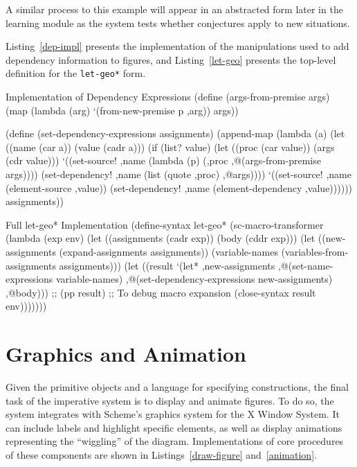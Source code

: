 A similar process to this example will appear in an abstracted form
later in the learning module as the system tests whether conjectures
apply to new situations.

\newpage
Listing~\ref{dep-impl} presents the implementation of the
manipulations used to add dependency information to figures, and
Listing~\ref{let-geo} presents the top-level definition for the
\texttt{let-geo*} form.

\begin{code-listing}
[label=dep-impl]
{Implementation of Dependency Expressions}
(define (args-from-premise args)
  (map (lambda (arg)
         `(from-new-premise p ,arg))
       args))

(define (set-dependency-expressions assignments)
  (append-map
   (lambda (a)
     (let ((name (car a))
           (value (cadr a)))
       (if (list? value)
           (let ((proc (car value))
                 (args (cdr value)))
             `((set-source!
                ,name (lambda (p) (,proc ,@(args-from-premise args))))
               (set-dependency!
                ,name (list (quote ,proc) ,@args))))
           `((set-source! ,name (element-source ,value))
             (set-dependency! ,name (element-dependency ,value))))))
   assignments))
\end{code-listing}

\begin{code-listing}
[label=let-geo]
{Full let-geo* Implementation}
(define-syntax let-geo*
  (sc-macro-transformer
   (lambda (exp env)
     (let ((assignments (cadr exp))
           (body (cddr exp)))
       (let ((new-assignments (expand-assignments assignments))
             (variable-names (variables-from-assignments assignments)))
         (let ((result `(let*
                            ,new-assignments
                          ,@(set-name-expressions variable-names)
                          ,@(set-dependency-expressions new-assignments)
                          ,@body)))
           ;; (pp result) ;; To debug macro expansion
           (close-syntax result env)))))))
\end{code-listing}

\newpage
\section{Graphics and Animation}

Given the primitive objects and a language for specifying
constructions, the final task of the imperative system is to display
and animate figures. To do so, the system integrates with Scheme's graphics
system for the X Window System. It can include labels and highlight specific
elements, as well as display animations representing the ``wiggling''
of the diagram. Implementations of core procedures of these components
are shown in Listings~\ref{draw-figure} and~\ref{animation}.

